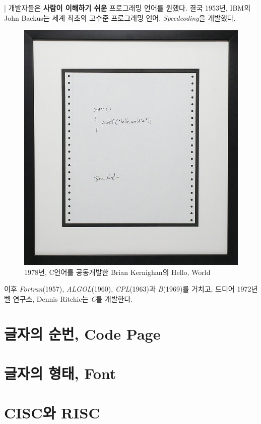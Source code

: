 \documentclass{article}
\begin{document}
| 개발자들은 \textbf{사람이 이해하기 쉬운} 프로그래밍 언어를 원했다.
결국 1953년, IBM의 John Backus는 세계 최초의 고수준 프로그래밍 언어,
\textit{Speedcoding}을 개발했다.

\begin{figure}[!h]
    \centering
    \includegraphics[width=\linewidth]{images/hello-world.jpg}
    \caption{1978년, C언어를 공동개발한 Brian Kernighan의 Hello, World}
\end{figure}

이후 \textit{Fortran}(1957), \textit{ALGOL}(1960), \textit{CPL}(1963)과
\textit{B}(1969)를 거치고, 드디어 1972년 벨 연구소, Dennis Ritchie는
\textit{C}를 개발한다.

\pagebreak

\appendix

\section{글자의 순번, Code Page}
\label{sec:code-page}

\section{글자의 형태, Font}
\label{sec:fonts}

\section{CISC와 RISC}
\label{sec:cisc-risc}
\end{document}
